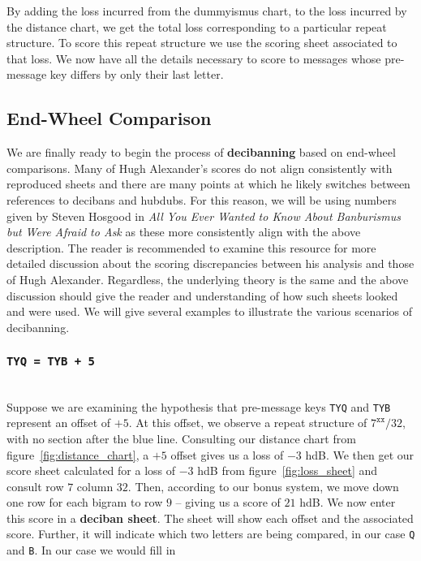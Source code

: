   \noindent By adding the loss incurred from the dummyismus chart, to the loss incurred by the distance chart, we get the total loss corresponding to a particular repeat structure. To score this repeat structure we use the scoring sheet associated to that loss. We now have all the details necessary to score to
  messages whose pre-message key differs by only their last letter.

  \subsection{End-Wheel Comparison}
  We are finally ready to begin the process of {\bf{decibanning}}
  based on end-wheel comparisons. Many of Hugh Alexander's scores do
  not align consistently with reproduced sheets and there are many
  points at which he likely switches between references to decibans
  and hubdubs. For this reason, we will be using numbers given by
  Steven Hosgood in \emph{All You Ever Wanted to Know About
  Banburismus but Were Afraid to Ask} as these more consistently align
  with the above description. The reader is recommended to examine
  this resource for more detailed discussion about the scoring
  discrepancies between his analysis and those of Hugh Alexander.
  Regardless, the underlying theory is the same and the above
  discussion should give the reader and understanding of how such
  sheets looked and were used. We will give several examples to
  illustrate the various scenarios of decibanning.
  \subsubsection{\texttt{TYQ = TYB + 5}}
  \text{}\\Suppose we are examining the hypothesis that pre-message
  keys \texttt{TYQ} and \texttt{TYB} represent an offset of $+5$. At
  this offset, we observe a repeat structure of $7^\texttt{xx}/32$,
  with no section after the blue line. Consulting our distance chart
  from figure~\ref{fig:distance_chart}, a $+5$ offset gives us a loss
  of $-3$ hdB. We then get our score sheet calculated for a loss of
  $-3$ hdB from figure~\ref{fig:loss_sheet} and consult row $7$
  column $32$. Then, according to our bonus system, we move down one
  row for each bigram to row $9$ -- giving us a score of $21$ hdB. We
  now enter this score in a  {\bf{deciban sheet}}. The sheet will
  show each offset and the associated score. Further, it will
  indicate which two letters are being compared, in our case
  \texttt{Q} and \texttt{B}. In our case we would fill in

